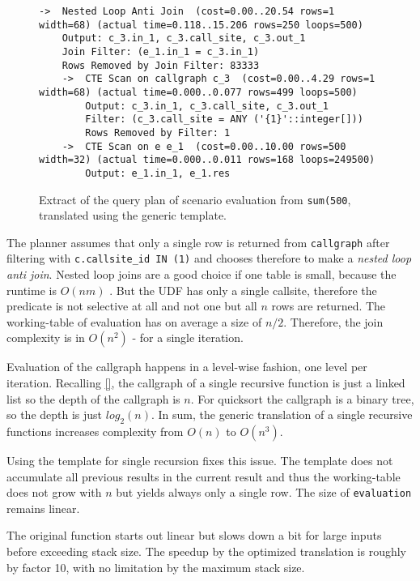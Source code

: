 \begin{figure}[h!]
    \centering\scriptsize
    \begin{verbatim}
->  Nested Loop Anti Join  (cost=0.00..20.54 rows=1 width=68) (actual time=0.118..15.206 rows=250 loops=500)
	Output: c_3.in_1, c_3.call_site, c_3.out_1
	Join Filter: (e_1.in_1 = c_3.in_1)
	Rows Removed by Join Filter: 83333
	->  CTE Scan on callgraph c_3  (cost=0.00..4.29 rows=1 width=68) (actual time=0.000..0.077 rows=499 loops=500)
	    Output: c_3.in_1, c_3.call_site, c_3.out_1
	    Filter: (c_3.call_site = ANY ('{1}'::integer[]))
	    Rows Removed by Filter: 1
	->  CTE Scan on e e_1  (cost=0.00..10.00 rows=500 width=32) (actual time=0.000..0.011 rows=168 loops=249500)
	    Output: e_1.in_1, e_1.res
    \end{verbatim}
    \caption{Extract of the query plan of scenario evaluation from \texttt{sum(500}, translated using the generic template.}
    \label{plan:sum}
\end{figure}

The planner assumes that only a single row is returned from \texttt{callgraph} after filtering with \texttt{c.callsite\_id IN (1)} and chooses therefore to make a \textit{nested loop anti join}. Nested loop joins are a good choice if one table is small, because the runtime is $O(nm)$ \cite{}. But the UDF has only a single callsite, therefore the predicate is not selective at all and not one but all $n$ rows are returned. The working-table of evaluation has on average a size of $n/2$. Therefore, the join complexity is in $O(n^2)$ - for a single iteration. 

Evaluation of the callgraph happens in a level-wise fashion, one level per iteration. Recalling \autoref{}, the callgraph of a single recursive function is just a linked list so the depth of the callgraph is $n$. For quicksort the callgraph is a binary tree, so the depth is just $log_2(n)$. In sum, the generic translation of a single recursive functions increases complexity from $O(n)$ to $O(n^3)$.

Using the template for single recursion fixes this issue. The template does not accumulate all previous results in the current result and thus the working-table does not grow with $n$ but yields always only a single row. The size of \texttt{evaluation} remains linear.

The original function starts out linear but slows down a bit for large inputs before exceeding stack size. The speedup by the optimized translation is roughly by factor 10, with no limitation by the maximum stack size.

